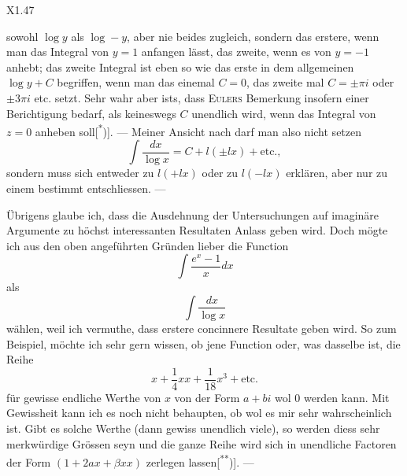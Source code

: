 \noindent X1.\hfill47\par
\clearpage{}
\noindent sowohl $\log y$ als $\log-y$, aber nie beides zugleich, sondern das erstere, wenn man das Integral von $y=1$ anfangen lässt, das zweite, wenn es von $y=-1$ anhebt; das zweite Integral ist eben so wie das erste in dem allgemeinen $\log y+C$ begriffen, wenn man das einemal $C=0$, das zweite mal $C=\pm\pi i$ oder $\pm3\pi i$ etc. setzt. Sehr wahr aber ists, dass \textsc{Eulers} Bemerkung insofern einer Berichtigung bedarf, als keineswegs $C$ unendlich wird, wenn das Integral von $z=0$ anheben soll[\textsuperscript{*})]. — Meiner Ansicht nach darf man also nicht setzen
\[
\int\frac{dx}{\log x}=C+l(\pm lx)+\text{etc.},
\]
\noindent sondern muss sich entweder zu $l(+lx)$ oder zu $l(-lx)$ erklären, aber nur zu einem bestimmt entschliessen. —

\indent Übrigens glaube ich, dass die Ausdehnung der Untersuchungen auf imaginäre Argumente zu höchst interessanten Resultaten Anlass geben wird. Doch mögte ich aus den oben angeführten Gründen lieber die Function
\[
\int\frac{e^x-1}{x}dx
\]
\noindent als
\[
\int\frac{dx}{\log x}
\]
\noindent wählen, weil ich vermuthe, dass erstere concinnere Resultate geben wird. So zum Beispiel, möchte ich sehr gern wissen, ob jene Function oder, was dasselbe ist, die Reihe
\[
x+\frac{1}{4}xx+\frac{1}{18}x^3+\text{etc.}
\]
\noindent für gewisse endliche Werthe von $x$ von der Form $a+bi$ wol 0 werden kann. Mit Gewissheit kann ich es noch nicht behaupten, ob wol es mir sehr wahrscheinlich ist. Gibt es solche Werthe (dann gewiss unendlich viele), so werden diess sehr merkwürdige Grössen seyn und die ganze Reihe wird sich in unendliche Factoren der Form $(1+2ax+\beta xx)$ zerlegen lassen[\textsuperscript{**})]. —

